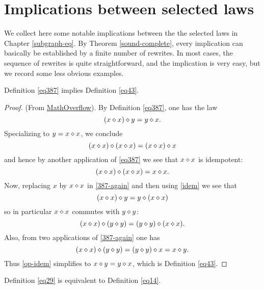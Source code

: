 \chapter{Implications between selected laws}

We collect here some notable implications between the the selected laws in Chapter \ref{subgraph-eq}.   By Theorem \ref{sound-complete}, every implication can basically be established by a finite number of rewrites.  In most cases, the sequence of rewrites is quite straightforward, and the implication is very easy, but we record some less obvious examples.

\begin{theorem}[387 implies 43]\label{387_implies_43}\leanok  Definition \ref{eq387} implies Definition \ref{eq43}.
\end{theorem}

\begin{proof}\leanok (From \href{https://mathoverflow.net/a/450905/766}{MathOverflow}).
  By Definition \ref{eq387}, one has the law
\begin{equation}\label{387-again}
  (x \diamond x) \diamond y = y \diamond x.
\end{equation}
Specializing to $y=x \diamond x$, we conclude
$$(x \diamond x) \diamond (x \diamond x) = (x \diamond x) \diamond x$$
and hence by another application of \eqref{eq387} we see that $x \diamond x$ is idempotent:
\begin{equation}\label{idem}
  (x \diamond x) \diamond (x \diamond x) = x \diamond x.
\end{equation}
Now, replacing $x$ by $x \diamond x$ in \eqref{387-again} and then using \eqref{idem} we see that
$$ (x \diamond x) \diamond y = y \diamond (x \diamond x)$$
so in particular $x \diamond x$ commutes with $y \diamond y$:
\begin{equation}\label{op-idem} (x \diamond x) \diamond (y \diamond y) = (y \diamond y) \diamond (x \diamond x).
\end{equation}
Also, from two applications of \eqref{387-again} one has
$$(x \diamond x) \diamond (y \diamond y) = (y \diamond y) \diamond x = x \diamond y.$$
Thus \eqref{op-idem} simplifies to $x \diamond y = y \diamond x$, which is Definition \ref{eq43}.
\end{proof}

\begin{theorem}[29 equivalent to 14]\label{29_equiv_14} \leanok  Definition \ref{eq29} is equivalent to Definition \ref{eq14}.
\end{theorem}

